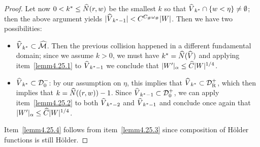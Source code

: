 \documentclass[10pt]{amsart}
\theoremstyle{definition}\newtheorem{defi}[theo]{Definition}\newtheorem{rema}[theo]{Remark}\newtheorem{exam}[theo]{Example}\newtheorem{exem}[theo]{Example}\newtheorem{nota}[theo]{Notation}
\newcommand{\const}{C_\#}
\newcommand{\cell}{\mathcal{D}}
\newcommand{\csp}{\mathcal{M}}
\newcommand{\cspi}{\widehat{\csp}}
\newcommand{\recoPrivate}{\mathrm{R}}
\newcommand{\backReco}{{\cell^+_{\recoPrivate}}}
\newcommand{\law}[1]{\omega_{#1}}
\newcommand{\lawc}{\law{\#}}
\newcommand{\adm}{_{\alpha^{+}}}
\newcommand{\Np}{\hat N}
\renewcommand{\adm}{_{\alpha}}
\let\oldhat\hat
\renewcommand*{\hat}[1]{\mathchoice{\widehat{#1}}{\widehat{#1}}{\oldhat{#1}}{\oldhat{#1}}}
\begin{document}
\begin{proof}
Let now $0 < k^{*} \le \Np(r,w)$ be the smallest $k$ so that $\hat V_{k^{*}} \cap \{w < \eta\}\not = \emptyset$; then the above argument yields $|\hat V_{k^{*}-1}| < C^{\const\lawc}|W|$. Then we have two possibilities:
\begin{itemize}
\item $\hat V_{k^{*}}\subset\cspi$. Then the previous collision happened in a different fundamental domain; since we assume $k > 0$, we must have $k^{*} = \Np(\hat V)$ and applying item~\eqref{lemm4.25.1} to $\hat V_{k^{*}-1}$ we conclude that $|W'|\adm\le \hat C|W|^{1/4}$.
\item $\hat V_{k^{*}}\subset\cell^{-}_{0}$: by our assumption on $\eta$, this implies that $\hat V_{k^{*}}\subset\backReco$, which then implies that $k = \Np((r,w))-1$. Since $\hat V_{k^{*}-1}\subset\cell^{+}_{0}$, we can apply item~\eqref{lemm4.25.2} to both $\hat{V}_{k^{*}-2}$ and $\hat V_{k^{*}-1}$ and conclude once again that $|W'|\adm\le \hat C|W|^{1/4}$.
\end{itemize}

Item~\eqref{lemm4.25.4} follows from item~\eqref{lemm4.25.3} since composition of H\"older functions is still H\"older.
\end{proof}
\end{document}
